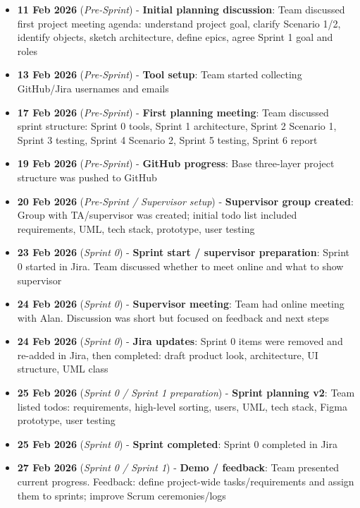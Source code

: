 \begingroup
\small
\sloppy
\begin{itemize}[leftmargin=*,itemsep=0.5em]
\item \textbf{11 Feb 2026} (\textit{Pre-Sprint}) - \textbf{Initial planning discussion}: Team discussed first project meeting agenda: understand project goal, clarify Scenario 1/2, identify objects, sketch architecture, define epics, agree Sprint 1 goal and roles
\item \textbf{13 Feb 2026} (\textit{Pre-Sprint}) - \textbf{Tool setup}: Team started collecting GitHub/Jira usernames and emails
\item \textbf{17 Feb 2026} (\textit{Pre-Sprint}) - \textbf{First planning meeting}: Team discussed sprint structure: Sprint 0 tools, Sprint 1 architecture, Sprint 2 Scenario 1, Sprint 3 testing, Sprint 4 Scenario 2, Sprint 5 testing, Sprint 6 report
\item \textbf{19 Feb 2026} (\textit{Pre-Sprint}) - \textbf{GitHub progress}: Base three-layer project structure was pushed to GitHub
\item \textbf{20 Feb 2026} (\textit{Pre-Sprint / Supervisor setup}) - \textbf{Supervisor group created}: Group with TA/supervisor was created; initial todo list included requirements, UML, tech stack, prototype, user testing
\item \textbf{23 Feb 2026} (\textit{Sprint 0}) - \textbf{Sprint start / supervisor preparation}: Sprint 0 started in Jira. Team discussed whether to meet online and what to show supervisor
\item \textbf{24 Feb 2026} (\textit{Sprint 0}) - \textbf{Supervisor meeting}: Team had online meeting with Alan. Discussion was short but focused on feedback and next steps
\item \textbf{24 Feb 2026} (\textit{Sprint 0}) - \textbf{Jira updates}: Sprint 0 items were removed and re-added in Jira, then completed: draft product look, architecture, UI structure, UML class
\item \textbf{25 Feb 2026} (\textit{Sprint 0 / Sprint 1 preparation}) - \textbf{Sprint planning v2}: Team listed todos: requirements, high-level sorting, users, UML, tech stack, Figma prototype, user testing
\item \textbf{25 Feb 2026} (\textit{Sprint 0}) - \textbf{Sprint completed}: Sprint 0 completed in Jira
\item \textbf{27 Feb 2026} (\textit{Sprint 0 / Sprint 1}) - \textbf{Demo / feedback}: Team presented current progress. Feedback: define project-wide tasks/requirements and assign them to sprints; improve Scrum ceremonies/logs

\end{itemize}
